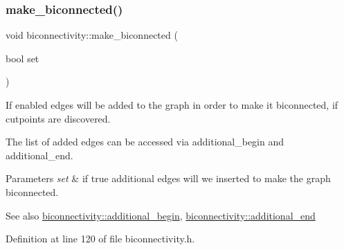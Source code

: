 \subsubsection{\texorpdfstring{make\+\_\+biconnected()}{make\_biconnected()}\hspace{0.1cm}{\footnotesize\ttfamily [1/2]}}
{\footnotesize\ttfamily void biconnectivity\+::make\+\_\+biconnected (\begin{DoxyParamCaption}\item[{bool}]{set }\end{DoxyParamCaption})\hspace{0.3cm}{\ttfamily [inline]}}



If enabled edges will be added to the graph in order to make it biconnected, if cutpoints are discovered. 

The list of added edges can be accessed via additional\+\_\+begin and additional\+\_\+end.


\begin{DoxyParams}{Parameters}
{\em set} & if true additional edges will we inserted to make the graph biconnected. \\
\hline
\end{DoxyParams}
\begin{DoxySeeAlso}{See also}
\mbox{\hyperlink{classbiconnectivity_a9560cdde8a90c12760b9930c494be410}{biconnectivity\+::additional\+\_\+begin}}, \mbox{\hyperlink{classbiconnectivity_a801847685ebf2b5727743cd21401e88c}{biconnectivity\+::additional\+\_\+end}} 
\end{DoxySeeAlso}


Definition at line 120 of file biconnectivity.\+h.


